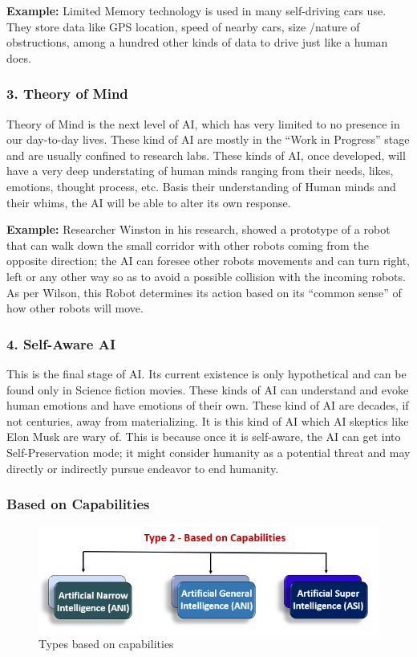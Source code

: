 {\bf Example:} Limited Memory technology is used in many self-driving cars use. They 
store data like GPS location, speed of nearby cars, size /nature of obstructions, 
among a hundred other kinds of data to drive just like a human does.


\subsubsection{3. Theory of Mind}

Theory of Mind is the next level of AI, which has very limited to no presence in our 
day-to-day lives. These kind of AI are mostly in the “Work in Progress” stage and are 
usually confined to research labs. These kinds of AI, once developed, will have a very 
deep understating of human minds ranging from their needs, likes, emotions, thought 
process, etc. Basis their understanding of Human minds and their whims, the AI will be 
able to alter its own response.

{\bf Example:} Researcher Winston in his research, showed a prototype of a robot that 
can walk down the small corridor with other robots coming from the opposite direction; 
the AI can foresee other robots movements and can turn right, left or any other way so 
as to avoid a possible collision with the incoming robots. As per Wilson, this Robot 
determines its action based on its “common sense” of how other robots will move.


\subsubsection{4. Self-Aware AI}

This is the final stage of AI. Its current existence is only hypothetical and can be 
found only in Science fiction movies. These kinds of AI can understand and evoke human 
emotions and have emotions of their own. These kind of AI are decades, if not centuries, 
away from materializing. It is this kind of AI which AI skeptics like Elon Musk are 
wary of. This is because once it is self-aware, the AI can get into Self-Preservation 
mode; it might consider humanity as a potential threat and may directly or indirectly 
pursue endeavor to end humanity.


\subsubsection{Based on Capabilities}

\begin{figure}[H]
\centering
\includegraphics[scale=0.618]{pix/basics/Types-of-Artificial-Intelligence-3.png}
\caption{Types based on capabilities}
\end{figure}


